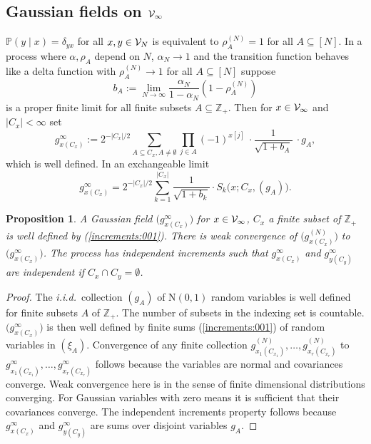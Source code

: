 \documentclass[preprint,11pt]{elsarticle}
\newtheorem{Proposition}{Proposition}
\theoremstyle{remark}
\def\iid{\emph{i.i.d.}~}
\begin{document}
{\subsection{Gaussian fields on ${\cal V}_\infty$}\label{GaussInfty:sec}
$\mathbb{P}(y\mid x) = \delta_{yx}$ for all $x,y \in {\cal V}_N$
is equivalent to $\rho_A^{(N)}=1$ for all $A \subseteq [N]$. In a process where $\alpha, \rho_A$ depend on $N$,  $\alpha_N \to 1$ and the transition function behaves like a delta function with $\rho_A^{(N)} \to 1$ for all $A\subseteq [N]$ suppose
\begin{equation*}
b_A := \lim_{N\to \infty} \frac{\alpha_N} {1-\alpha_N}(1-\rho^{(N)}_A)
\label{rholim:00}
\end{equation*}
is a proper finite limit for all finite subsets $A \subseteq \mathbb{Z}_+$. Then for $x\in {\cal V}_\infty$ and $|C_x| < \infty$ set
\begin{equation}
g^\infty_{x(C_x)} :=
 2^{-|C_x|/2}
\sum_{A \subseteq C_x, A \ne \emptyset}\prod_{j\in A}(-1)^{{x}[j]}\ \cdot
\frac{1}{\sqrt{1 + b_A}}\ \cdot
g_A,
\label{increments:001}
\end{equation}
which is well defined. In an exchangeable limit
\begin{equation*}
g^\infty_{x(C_x)}
=  2^{-|C_x|/2}
\sum_{k=1}^{|C_x|}
\frac {1}{\sqrt { 1 + b_k}}
\cdot S_k\big (x;C_x,(g_A)\big ).
\label{exchcirc:00aa}
\end{equation*}
\begin{Proposition}
A Gaussian field $\big (g^\infty_{x(C_x)}\big )$ for $x \in {\cal V}_\infty$, $C_x$ a finite subset of 
$\mathbb{Z}_+$ is well defined by (\ref{increments:001}). There is weak convergence of 
$\big (g^{(N)}_{x(C_x)}\big )$ to $\big (g^\infty_{x(C_x)}\big )$.
The process has independent increments such that $g^\infty_{x(C_x)}$ and $g^\infty_{y(C_y)}$ are independent if $C_x\cap C_y = \emptyset$.
\end{Proposition}
\begin{proof}
The \iid  collection $(g_A)$ of N$(0,1)$ random variables is well defined for finite subsets $A$ of $\mathbb{Z}_+$. The number of subsets in the indexing set is countable. $\big (g^\infty_{x(C_x)}\big )$ is then well defined by finite sums 
(\ref{increments:001}) of random variables in $(\xi_A)$. Convergence of any finite collection
$g^{(N)}_{x_1(C_{x_1})},\ldots, g^{(N)}_{x_r(C_{x_r})}$ to 
$g^{\infty}_{x_1(C_{x_1})},\ldots, g^{\infty}_{x_r(C_{x_r})}$ follows because the variables are normal and covariances converge. Weak convergence here is in the sense of finite dimensional distributions converging. For Gaussian variables with zero means it is sufficient that their covariances converge.
 The independent increments property follows because $g^\infty_{x(C_x)}$ and $g^\infty_{y(C_y)}$ are sums over disjoint variables $g_A$.
\end{proof}
%
}
\end{document}
